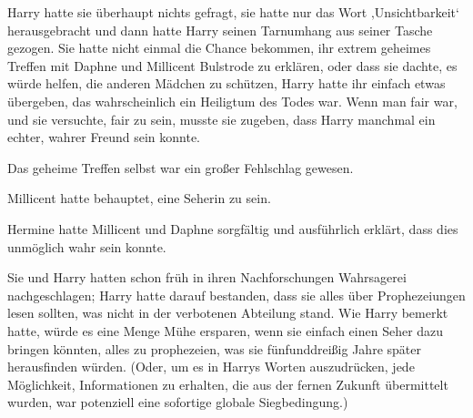 Harry hatte sie überhaupt nichts gefragt, sie hatte nur das Wort ‚Unsichtbarkeit‘ herausgebracht und dann hatte Harry seinen Tarnumhang aus seiner Tasche gezogen. Sie hatte nicht einmal die Chance bekommen, ihr extrem geheimes Treffen mit Daphne und Millicent Bulstrode zu erklären, oder dass sie dachte, es würde helfen, die anderen Mädchen zu schützen, Harry hatte ihr einfach etwas übergeben, das wahrscheinlich ein Heiligtum des Todes war. Wenn man fair war, und sie versuchte, fair zu sein, musste sie zugeben, dass Harry manchmal ein echter, wahrer Freund sein konnte.

Das geheime Treffen selbst war ein großer Fehlschlag gewesen.

Millicent hatte behauptet, eine Seherin zu sein.

Hermine hatte Millicent und Daphne sorgfältig und ausführlich erklärt, dass dies unmöglich wahr sein konnte.

Sie und Harry hatten schon früh in ihren Nachforschungen Wahrsagerei nachgeschlagen; Harry hatte darauf bestanden, dass sie alles über Prophezeiungen lesen sollten, was nicht in der verbotenen Abteilung stand. Wie Harry bemerkt hatte, würde es eine Menge Mühe ersparen, wenn sie einfach einen Seher dazu bringen könnten, alles zu prophezeien, was sie fünfunddreißig Jahre später herausfinden würden. (Oder, um es in Harrys Worten auszudrücken, jede Möglichkeit, Informationen zu erhalten, die aus der fernen Zukunft übermittelt wurden, war potenziell eine sofortige globale Siegbedingung.)


